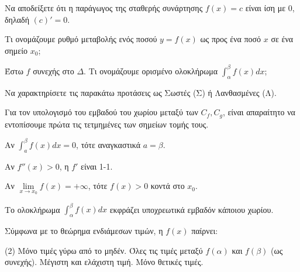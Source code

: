 \documentclass[11pt,a4paper]{article}
\newcommand{\kerkissans}[1]{{\fontfamily{maksf}\selectfont \textbf{#1}}}
\renewcommand{\textdexiakeraia}{}
\newcommand{\dint}{\displaystyle\int}
\newcommand\themanum{A}
\newcounter{thema}[section]
\renewcommand{\thethema}{\arabic{thema}}
\newcommand{\Thema}{\refstepcounter{thema}{\textbf{\textcolor{black}{\faPenSquare\ \  \large \kerkissans{\textbf{\thethemaο\hspace{2mm}Διαγώνισμα - Θέμα \themanum}}}}}\hspace{0mm}}{}
\newenvironment{thema}[1]
{\begin{tcolorbox}[title=\Thema\kerkissans{\textbf{\large{  #1}}},breakable,
enhanced standard,titlerule=0pt,toprule=0pt, rightrule=0pt, bottomrule=0pt,
colback=white,left=0mm,top=1mm,bottom=0mm,
boxrule=0pt,
colframe=white,leftrule=0mm,sharp corners,coltitle=black]
\renewcommand{\themanum}{#1}}
{\end{tcolorbox}}
\begin{document}
\begin{thema}{A}
\begin{erwthma}
    \item Να αποδείξετε ότι η παράγωγος της σταθερής συνάρτησης $f(x) = c$ είναι ίση με $0$, δηλαδή $(c)' = 0$.
    \item Τι ονομάζουμε ρυθμό μεταβολής ενός ποσού $y=f(x)$ ως προς ένα ποσό $x$ σε ένα σημείο $x_0$;
    \item Έστω $f$ συνεχής στο $\Delta$. Τι ονομάζουμε ορισμένο ολοκλήρωμα $\int_\alpha^\beta f(x) dx$;
    \item Να χαρακτηρίσετε τις παρακάτω προτάσεις ως Σωστές (Σ) ή Λανθασμένες (Λ).
    \begin{alist}
        \item Για τον υπολογισμό του εμβαδού του χωρίου μεταξύ των $C_f, C_g$, είναι απαραίτητο να εντοπίσουμε πρώτα τις τετμημένες των σημείων τομής τους.
        \item Αν $\dint_a^\beta f(x)dx = 0$, τότε αναγκαστικά $a = \beta$.
        \item Αν $f''(x) > 0$, η $f'$ είναι 1-1.
        \item Αν $\lim\limits_{x\to x_0} f(x) = +\infty$, τότε $f(x) > 0$ κοντά στο $x_0$.
        \item Το ολοκλήρωμα $\dint_{\alpha}^{\beta} f(x) dx$ εκφράζει υποχρεωτικά εμβαδόν κάποιου χωρίου.
    \end{alist}
    \item Σύμφωνα με το θεώρημα ενδιάμεσων τιμών, η $f(x)$ παίρνει:
    \begin{tasks}[label=\let\textdexiakeraia\relax\alph*.](2)
        \task Μόνο τιμές γύρω από το μηδέν.
        \task Όλες τις τιμές μεταξύ $f(\alpha)$ και $f(\beta)$ (ως συνεχής).
        \task Μέγιστη και ελάχιστη τιμή.
        \task Μόνο θετικές τιμές.
    \end{tasks}
\end{erwthma}
\end{thema}
\vspace{1cm}
\end{document}

